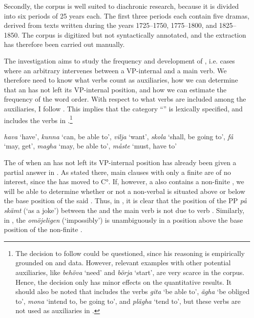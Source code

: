 \documentclass[output=paper, colorlinks, citecolor=brown]{langscibook}
\begin{document}
Secondly, the corpus is well suited to diachronic research, because it is divided into six periods of 25 years each. The first three periods each contain five dramas, derived from texts written during the years 1725–1750, 1775–1800, and 1825–1850. The corpus is digitized but not syntactically annotated, and the extraction has therefore been carried out manually.


The investigation aims to study the frequency and development of , i.e. cases where an arbitrary  intervenes between a VP-internal  and a main verb. We therefore need to know what verbs count as auxiliaries, how we can determine that an  has not left its VP-internal position, and how we can estimate the frequency of the word order. With respect to what verbs are included among the auxiliaries, I follow \citet[162--163]{Delsing1999}. This implies that the category “” is lexically specified, and includes the verbs in .\footnote{The decision to follow \citet{Delsing1999} could be questioned, since his reasoning is empirically grounded on  and  data. However, relevant examples with other potential auxiliaries, like \textit{behöva} ‘need’ and \textit{börja} ‘start’, are very scarce in the corpus. Hence, the decision only has minor effects on the quantitative results. It should also be noted that \citet{Delsing1999} includes the verbs \textit{gita} ‘be able to’, \textit{ägha} ‘be obliged to’, \textit{mona} ‘intend to, be going to’, and \textit{plägha} ‘tend to’, but these verbs are not used as auxiliaries in .}


\ea
\label{ex:sangfelt:21}
\textit{hava} ‘have’,
\textit{kunna} ‘can, be able to’,
\textit{vilja} ‘want’,
\textit{skola} ‘shall, be going to’, 
\textit{få} ‘may, get’,
\textit{magha} ‘may, be able to’,
\textit{måste} ‘must, have to’
\z 


The  of when an  has not left its VP-internal position has already been given a partial answer in . As stated there, main clauses with only a finite  are of no interest, since the  has moved to C°. If, however, a  also contains a non-finite , we will be able to determine whether or not a non-verbal  is situated above or below the base position of the said . Thus, in , it is clear that the position of the PP  \textit{på skämt} (‘as a joke’) between the  and the main verb is not due to verb . Similarly, in , the  \textit{omöjeligen} (‘impossibly’) is unambiguously in a position above the base position of the non-finite .
\end{document}

